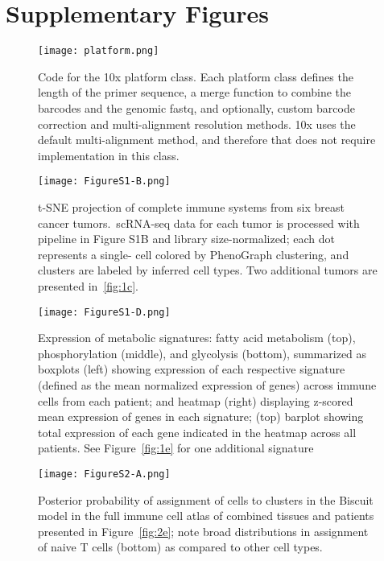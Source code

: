 
\chapter[Supplementary Figures][Supplementary Figures]{Supplementary Figures}

\begin{figure}
\centering
\texttt{[image: platform.png]}
\caption{Code for the 10x platform class. Each platform class defines the length of the primer sequence, a merge function to combine the barcodes and the genomic fastq, and optionally, custom barcode correction and multi-alignment resolution methods. 10x uses the default multi-alignment method, and therefore that does not require implementation in this class.}

\label{fig:10x_platform}
\end{figure}

\begin{figure}
\centering
\texttt{[image: FigureS1-B.png]}
\caption{t-SNE projection of complete immune systems from six breast cancer tumors.\ scRNA-seq data for each tumor is processed with pipeline in Figure S1B and library size-normalized; each dot represents a single- cell colored by PhenoGraph clustering, and clusters are labeled by inferred cell types. Two additional tumors are presented in~\ref{fig:1c}.
}
\label{fig:s1b}
\end{figure}

\begin{figure}
\centering
\texttt{[image: FigureS1-D.png]}
\caption{Expression of metabolic signatures: fatty acid metabolism (top), phosphorylation (middle), and glycolysis (bottom), summarized as boxplots (left) showing expression of each respective signature (defined as the mean normalized expression of genes)  across immune cells from each patient; and heatmap (right) displaying z-scored mean expression of genes in each signature; (top) barplot showing total expression of each gene indicated in the heatmap across all patients. See Figure~\ref{fig:1e} for one additional signature
}
\label{fig:s1d}
\end{figure}

\begin{figure}
\centering
\texttt{[image: FigureS2-A.png]}
\caption{Posterior probability of assignment of cells to clusters in the Biscuit model in the full immune cell atlas of combined tissues and patients presented in Figure~\ref{fig:2e}; note broad distributions in assignment of naive T cells (bottom) as compared to other cell types.
}
\label{fig:s2a}
\end{figure}

